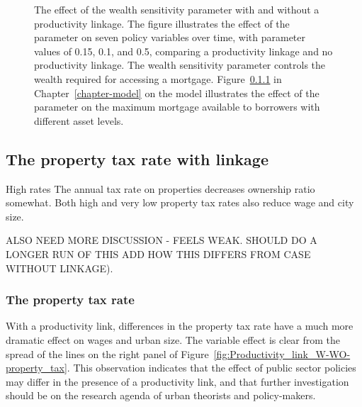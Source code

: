 \begin{figure}[h!tb]
    \caption[The effect of the wealth sensitivity parameter with and without a productivity linkage]{The effect of the wealth sensitivity parameter with and without a productivity linkage. The figure illustrates the effect of the parameter on seven policy variables over time, with parameter values of 0.15, 0.1, and 0.5, comparing a productivity linkage and no productivity linkage. The wealth sensitivity parameter controls the wealth required for accessing a mortgage. {\color{red} Figure~\ref{} in Chapter~\ref{chapter-model} on the model illustrates the effect of the parameter on the maximum mortgage available to borrowers with different asset levels.}}
    \label{fig:Productivity_link_W-WO-wealth}
\end{figure}


\newpage
\subsection{The property tax rate  with linkage}
High rates The annual tax rate on properties decreases ownership ratio somewhat. 
Both high and very low property tax rates also reduce wage and city size. %

{\color{red}ALSO NEED MORE DISCUSSION - FEELS WEAK. SHOULD DO A LONGER RUN OF THIS}
{\color{red} ADD HOW THIS DIFFERS FROM CASE WITHOUT LINKAGE).}


\subsubsection{The property tax rate}

With a productivity link, differences in the property tax rate have a much more dramatic effect on wages and urban size. The variable effect is clear from the spread of the lines on the right panel of Figure~\ref{fig:Productivity_link_W-WO-property_tax}.  This observation indicates that the effect of public sector policies may differ in the presence of a productivity link, and that further investigation %
should be on the research agenda of urban theorists and policy-makers.

